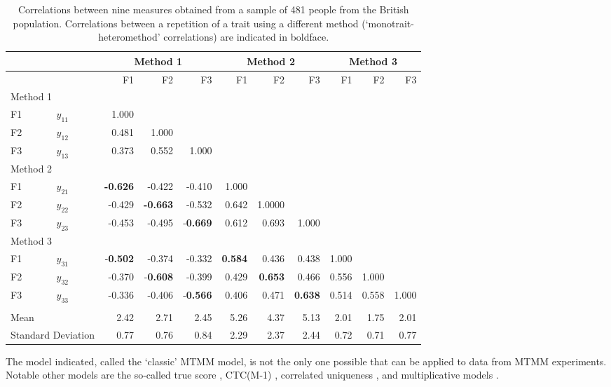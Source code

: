 \documentclass[a4paper,12pt]{article}
\begin{document}
\begin{table}[hbt]\centering\caption{Correlations between nine measures obtained from a sample of 481 people from the British population. Correlations between a repetition of a trait using a different method (`monotrait-heteromethod' correlations) are indicated in boldface.\label{tab:mtmm_cor}}
\begin{tabular}{llrrrrrrrrr}\hline
& &\multicolumn{3}{c}{Method 1} & \multicolumn{3}{c}{Method 2} & \multicolumn{3}{c}{Method  3} \\ 
\hline
&& F1 & F2 & F3 & F1 & F2 & F3 & F1 & F2 & F3 \\ 
\multicolumn{2}{l}{Method 1}\\ 
F1 &$y_{11}$ & 1.000 \\ 
F2 &$y_{12}$ & 0.481 & 1.000 &  \\ 
F3 &$y_{13}$ & 0.373 & 0.552 & 1.000 \\ 
\multicolumn{2}{l}{Method 2}\\ 
F1 & $y_{21}$ &\textbf{-0.626} & -0.422 & -0.410 & 1.000 \\ 
F2 & $y_{22}$ &-0.429 & \textbf{-0.663} & -0.532 & 0.642 & 1.0000 \\ 
F3 & $y_{23}$ &-0.453 & -0.495 & -\textbf{0.669} & 0.612 & 0.693 & 1.000 \\ 
\multicolumn{2}{l}{Method 3}\\
F1 & $y_{31}$ &-\textbf{0.502} & -0.374 & -0.332 & \textbf{0.584} & 0.436 & 0.438 & 1.000 \\ 
F2 & $y_{32}$ &-0.370 & -\textbf{0.608} & -0.399 & 0.429 & \textbf{0.653} & 0.466 & 0.556 & 1.000 \\ 
F3 & $y_{33}$ &-0.336 & -0.406 & -\textbf{0.566} & 0.406 & 0.471 & \textbf{0.638} & 0.514 & 0.558 & 1.000 \\ 
 \\ 
\multicolumn{2}{l}{Mean}  &2.42 & 2.71 & 2.45 & 5.26 & 4.37 & 5.13 & 2.01 & 1.75 & 2.01 \\ 
\multicolumn{2}{l}{Standard Deviation} & 0.77 & 0.76 & 0.84 & 2.29 & 2.37 & 2.44 & 0.72 & 0.71 & 0.77 \\ 
\hline
\end{tabular}
\end{table}
The model indicated, called the `classic' MTMM model, is not the only one possible that can be applied to data from MTMM experiments. Notable other models are the so-called true score \citep{saris_evaluation_1991},  CTC(M-1)  \citep{eid_multitrait_2000},  correlated uniqueness  \citep{kenny_empirical_1976}, and multiplicative models \citep{campbell_method_1967}. 
\end{document}
